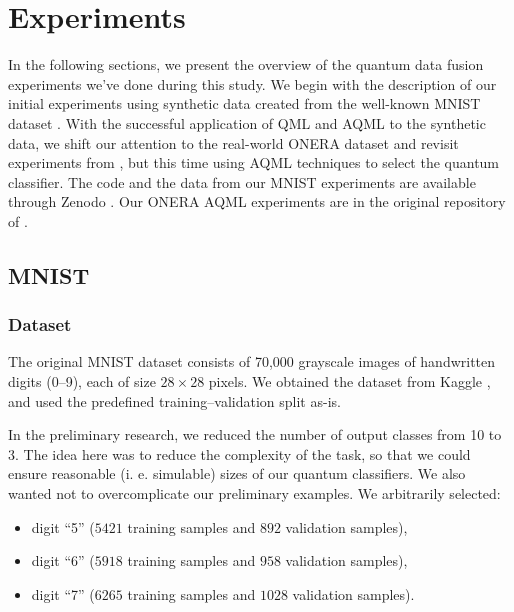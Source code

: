 \documentclass[runningheads]{llncs}
\begin{document}
\section{Experiments}
\label{sec:exp}

In the following sections, we present the overview of the quantum data fusion experiments we've done during this study.
We begin with the description of our initial experiments using synthetic data created from the well-known MNIST dataset
\cite{lecunMNISTHandwrittenDigits2025}. With the successful application of QML and AQML to the synthetic data, we shift
our attention to the real-world ONERA dataset \cite{onera} and revisit experiments from \cite{QMLCaseStudy}, but this
time using AQML techniques to select the quantum classifier. The code and the data from our MNIST experiments are
available through Zenodo \cite{dziura_2026_18717347}. Our ONERA AQML experiments are in the original repository of
\cite{QMLCaseStudy}.

\subsection{MNIST}

\subsubsection{Dataset}
The original MNIST dataset consists of 70,000 grayscale images of handwritten digits (0--9), each of size $28
	\times 28$ pixels. We obtained the dataset from Kaggle \cite{lecunMNISTHandwrittenDigits2025}, and used the
predefined training--validation split as-is.

In the preliminary research, we reduced the number of output classes from 10 to 3. The idea here was to reduce the
complexity of the task, so that we could ensure reasonable (i. e. simulable) sizes of our quantum classifiers. We
also wanted not to overcomplicate our preliminary examples. We arbitrarily selected:
\begin{itemize}
	\item digit ``5'' (\(5421\) training samples and \(892\) validation samples),
	\item digit ``6'' (\(5918\) training samples and \(958\) validation samples),
	\item digit ``7'' (\(6265\) training samples and \(1028\) validation samples).
\end{itemize}
\end{document}
